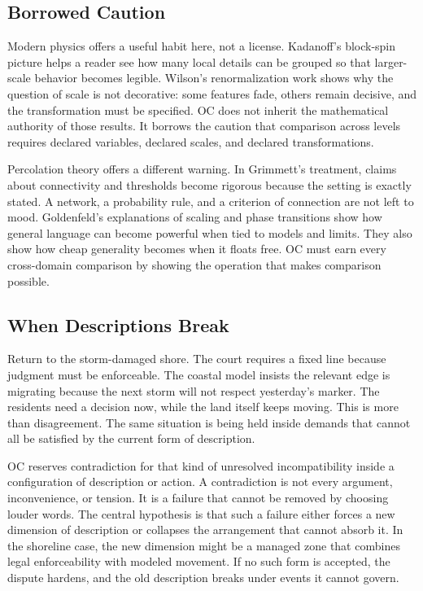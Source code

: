 \documentclass[11pt,a4paper,openany]{book}
\begin{document}
\subsection{Borrowed Caution}
Modern physics offers a useful habit here, not a license. Kadanoff's block-spin picture helps a reader see how many local details can be grouped so that larger-scale behavior becomes legible. Wilson's renormalization work shows why the question of scale is not decorative: some features fade, others remain decisive, and the transformation must be specified. OC does not inherit the mathematical authority of those results. It borrows the caution that comparison across levels requires declared variables, declared scales, and declared transformations. \cite{grimmett_percolation,goldenfeld_lectures}\par
Percolation theory offers a different warning. In Grimmett's treatment, claims about connectivity and thresholds become rigorous because the setting is exactly stated. A network, a probability rule, and a criterion of connection are not left to mood. Goldenfeld's explanations of scaling and phase transitions show how general language can become powerful when tied to models and limits. They also show how cheap generality becomes when it floats free. OC must earn every cross-domain comparison by showing the operation that makes comparison possible.\par
\subsection{When Descriptions Break}
Return to the storm-damaged shore. The court requires a fixed line because judgment must be enforceable. The coastal model insists the relevant edge is migrating because the next storm will not respect yesterday's marker. The residents need a decision now, while the land itself keeps moving. This is more than disagreement. The same situation is being held inside demands that cannot all be satisfied by the current form of description. \cite{grimmett_percolation,goldenfeld_lectures}\par
OC reserves contradiction for that kind of unresolved incompatibility inside a configuration of description or action. A contradiction is not every argument, inconvenience, or tension. It is a failure that cannot be removed by choosing louder words. The central hypothesis is that such a failure either forces a new dimension of description or collapses the arrangement that cannot absorb it. In the shoreline case, the new dimension might be a managed zone that combines legal enforceability with modeled movement. If no such form is accepted, the dispute hardens, and the old description breaks under events it cannot govern.\par
\end{document}
